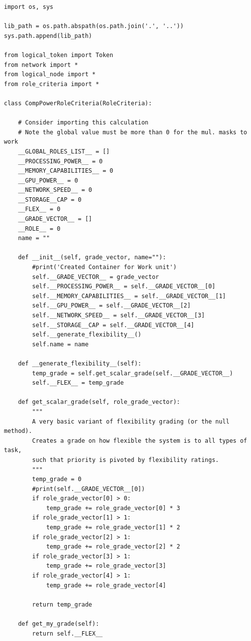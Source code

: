 \documentclass[11pt]{article}
\begin{document}
\lstset{frame=single, caption=Framework Listing}
\begin{lstlisting}
import os, sys

lib_path = os.path.abspath(os.path.join('.', '..'))
sys.path.append(lib_path)

from logical_token import Token
from network import *
from logical_node import *
from role_criteria import *

class CompPowerRoleCriteria(RoleCriteria):

    # Consider importing this calculation
    # Note the global value must be more than 0 for the mul. masks to work
    __GLOBAL_ROLES_LIST__ = []
    __PROCESSING_POWER__ = 0
    __MEMORY_CAPABILITIES__ = 0
    __GPU_POWER__ = 0
    __NETWORK_SPEED__ = 0
    __STORAGE__CAP = 0
    __FLEX__ = 0
    __GRADE_VECTOR__ = []
    __ROLE__ = 0
    name = ""

    def __init__(self, grade_vector, name=""):
        #print('Created Container for Work unit')
        self.__GRADE_VECTOR__ = grade_vector
        self.__PROCESSING_POWER__ = self.__GRADE_VECTOR__[0]
        self.__MEMORY_CAPABILITIES__ = self.__GRADE_VECTOR__[1]
        self.__GPU_POWER__ = self.__GRADE_VECTOR__[2]
        self.__NETWORK_SPEED__ = self.__GRADE_VECTOR__[3]
        self.__STORAGE__CAP = self.__GRADE_VECTOR__[4]
        self.__generate_flexibility__()
        self.name = name

    def __generate_flexibility__(self):
        temp_grade = self.get_scalar_grade(self.__GRADE_VECTOR__)
        self.__FLEX__ = temp_grade

    def get_scalar_grade(self, role_grade_vector):
        """
        A very basic variant of flexibility grading (or the null method).
        Creates a grade on how flexible the system is to all types of task,
        such that priority is pivoted by flexibility ratings.
        """
        temp_grade = 0
        #print(self.__GRADE_VECTOR__[0])
        if role_grade_vector[0] > 0:
            temp_grade += role_grade_vector[0] * 3
        if role_grade_vector[1] > 1:
            temp_grade += role_grade_vector[1] * 2
        if role_grade_vector[2] > 1:
            temp_grade += role_grade_vector[2] * 2
        if role_grade_vector[3] > 1:
            temp_grade += role_grade_vector[3]
        if role_grade_vector[4] > 1:
            temp_grade += role_grade_vector[4]

        return temp_grade

    def get_my_grade(self):
        return self.__FLEX__


\end{lstlisting}
\end{document}
